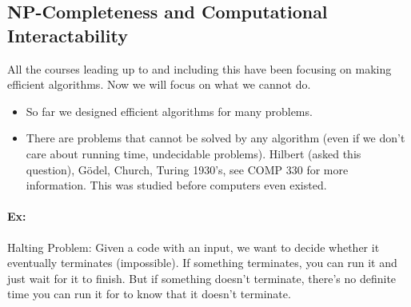 \documentclass[12 pt]{article}
\begin{document}
          \subsection{NP-Completeness and Computational
            Interactability}
          All the courses leading up to and including this have been
          focusing on making efficient algorithms. Now we will focus
          on what we cannot do.
          \begin{itemize}
          \item So far we designed efficient algorithms for many
            problems.
          \item There are problems that cannot be solved by any
            algorithm (even if we don't care about running time,
            undecidable problems). Hilbert (asked this question),
            G\"odel, Church, Turing 1930's, see COMP 330 for more
            information. This was studied before computers even
            existed.
          \end{itemize}
          \paragraph{Ex:} Halting Problem: Given a code with an input,
          we want to decide whether it eventually terminates
          (impossible). If something terminates, you can run it and
          just wait for it to finish. But if something doesn't
          terminate, there's no definite time you can run it for to
          know that it doesn't terminate.
\end{document}
